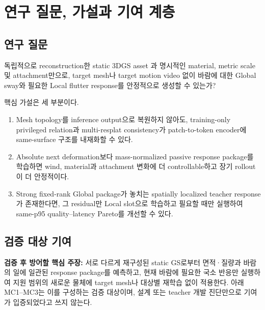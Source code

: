 \documentclass[11pt]{article}
\begin{document}
\section{연구 질문, 가설과 기여 계층}

\subsection{연구 질문}

독립적으로 reconstruction한 static 3DGS asset \cite{kerbl2023gaussian}과 명시적인
material, metric scale 및 attachment만으로, target mesh나 target motion video 없이
바람에 대한 Global sway와 필요한 Local flutter response를 안정적으로 생성할 수 있는가?

핵심 가설은 세 부분이다.

\begin{enumerate}
  \item Mesh topology를 inference output으로 복원하지 않아도, training-only privileged relation과
  multi-resplat consistency가 patch-to-token encoder에 same-surface 구조를 내재화할 수 있다.
  \item Absolute next deformation보다 mass-normalized passive response package를 학습하면
  wind, material과 attachment 변화에 더 controllable하고 장기 rollout이 더 안정적이다.
  \item Strong fixed-rank Global package가 놓치는 spatially localized teacher response가 존재한다면,
  그 residual만 Local slot으로 학습하고 필요할 때만 실행하여 same-p95 quality--latency Pareto를 개선할 수 있다.
\end{enumerate}

\subsection{검증 대상 기여}

\textbf{검증 후 방어할 핵심 주장:} 서로 다르게 재구성된 static GS로부터 면적·질량과 바람의 일에
일관된 response package를 예측하고, 현재 바람에 필요한 국소 반응만 실행하여 지원 범위의 새로운
물체에 target mesh나 대상별 재학습 없이 적용한다. 아래 MC1--MC3는 이를 구성하는 검증 대상이며,
설계 또는 teacher 개발 진단만으로 기여가 입증되었다고 쓰지 않는다.
\end{document}
